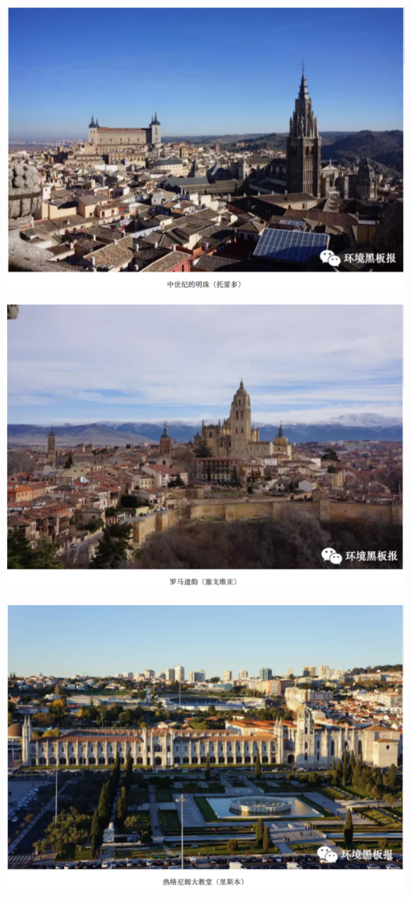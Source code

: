 \documentclass[
]{book}
\begin{document}
\includegraphics[width=8.33in]{images/xt4}

\includegraphics[width=8.33in]{images/xt5}

\includegraphics[width=8.33in]{images/xt6}
\end{document}
